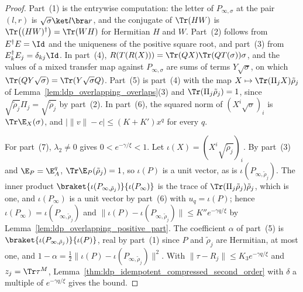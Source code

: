 \begin{proof}
    \leanok
    Part~(1) is the entrywise computation: the letter of $P_{\infty,\sigma}$ at the pair
    $(l,r)$ is $\sqrt\sigma\ket l\bra r$, and the conjugate of $\Tr(HW)$ is
    $\Tr\bigl((HW)^\dagger\bigr)=\Tr(WH)$ for Hermitian $H$ and $W$. Part~(2) follows from
    $E^\dagger E=\Id$ and the uniqueness of the positive square root, and part~(3) from
    $E_k^\dagger E_j=\delta_{kj}\Id$. In part~(4),
    $R(T(R(X)))=\Tr(QX)\Tr(QT(\sigma))\sigma$, and the values of a mixed transfer map
    against $P_{\infty,\sigma}$ are sums of terms $Y\sqrt\sigma$, on which
    $\Tr(QY\sqrt\sigma)=\Tr(Y\sqrt\sigma Q)$. Part~(5) is part~(4) with the map
    $X\mapsto\Tr(\Pi_jX)\tilde\rho_j$ of Lemma~\ref{lem:ldp_overlapping_overlaps}(3) and
    $\Tr(\Pi_j\tilde\rho_j)=1$, since $\sqrt{\tilde\rho_j}\Pi_j=\sqrt{\tilde\rho_j}$ by
    part~(2). In part~(6), the squared norm of $(X^i\sqrt\sigma)_i$ is $\Tr\E_X(\sigma)$, and
    $\lvert\lVert v\rVert-c\rvert\le(K+K')x^q$ for every $q$.

    For part~(7), $\lambda_2\neq0$ gives $0<e^{-\gamma/\xi}<1$. Let $\iota(X)=(X^i\sqrt{\tilde\rho_j})_i$. By part~(3) and
    $\E_P=\E_A^q$, $\Tr\E_P(\tilde\rho_j)=1$, so $\iota(P)$ is a unit vector, as is
    $\iota(P_{\infty,\tilde\rho_j})$. The inner product
    $\braket{\iota(P_{\infty,\tilde\rho_j})}{\iota(P_\infty)}$ is the trace of
    $\Tr(\Pi_j\tilde\rho_j)\tilde\rho_j$, which is one, and $\iota(P_\infty)$ is a unit vector
    by part~(6) with $u_q=\iota(P)$; hence $\iota(P_\infty)=\iota(P_{\infty,\tilde\rho_j})$ and
    $\lVert\iota(P)-\iota(P_{\infty,\tilde\rho_j})\rVert\le K''e^{-\gamma q/\xi}$ by
    Lemma~\ref{lem:ldp_overlapping_positive_part}. The coefficient $\alpha$ of part~(5) is
    $\braket{\iota(P_{\infty,\tilde\rho_j})}{\iota(P)}$, real by part~(1) since $P$ and
    $\tilde\rho_j$ are Hermitian, at most one, and
    $1-\alpha=\tfrac12\lVert\iota(P)-\iota(P_{\infty,\tilde\rho_j})\rVert^2$. With
    $\lVert\tau-R_j\rVert\le K_3e^{-\gamma q/\xi}$ and $z_j=\Tr\tau^M$,
    Lemma~\ref{thm:ldp_idempotent_compressed_second_order} with
    $\delta$ a multiple of $e^{-\gamma q/\xi}$ gives the bound.
\end{proof}

